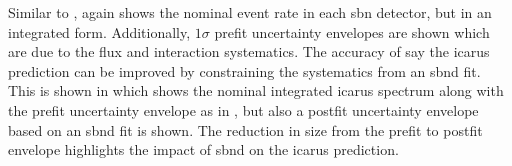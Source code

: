 Similar to ,  again shows the nominal event rate in each \gls{sbn} detector, but in an integrated form. Additionally, $1\sigma$ prefit uncertainty envelopes are shown which are due to the flux and interaction systematics. The accuracy of say the \gls{icarus} prediction can be improved by constraining the systematics from an \gls{sbnd} fit. This is shown in  which shows the nominal integrated \gls{icarus} spectrum along with the prefit uncertainty envelope as in , but also a postfit uncertainty envelope based on an \gls{sbnd} fit is shown. The reduction in size from the prefit to postfit envelope highlights the impact of \gls{sbnd} on the \gls{icarus} prediction. 

